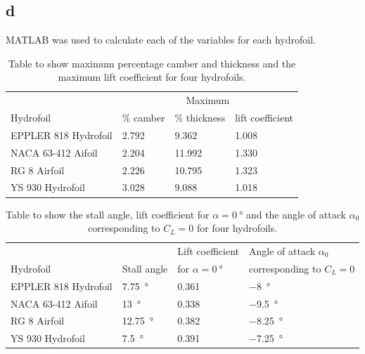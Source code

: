 \documentclass[11pt]{article}
\numberwithin{equation}{section}
\begin{document}
\subsection{d}
MATLAB was used to calculate each of the variables for each hydrofoil.

\begin{table}[H]
    \centering
    \begin{tabular}{@{}llll@{}}
    \toprule
        & \multicolumn{3}{c}{Maximum}\\
        \cline{2-4}
        Hydrofoil& \% camber & \% thickness & lift coefficient \\
    \midrule
        EPPLER 818 Hydrofoil & 2.792 & 9.362  & 1.008 \\
        NACA 63-412 Aifoil   & 2.204 & 11.992 & 1.330 \\
        RG 8 Airfoil         & 2.226 & 10.795 & 1.323 \\
        YS 930 Hydrofoil     & 3.028 & 9.088  & 1.018 \\ 
    \bottomrule
    \end{tabular}
    \caption{Table to show maximum percentage camber and thickness and the maximum lift coefficient for four hydrofoils.}
\end{table}
\begin{table}[H]
    \centering
    \begin{tabular}{@{}llll@{}}
    \toprule
        & & Lift coefficient & Angle of attack $\alpha_0$\\
        Hydrofoil & Stall angle  & for $\alpha = \SI{0}{\degree}$ & corresponding to $C_L = 0$\\
    \midrule
        EPPLER 818 Hydrofoil & \SI{7.75}{\degree}  & 0.361 & \SI{-8}{\degree}    \\
        NACA 63-412 Aifoil   & \SI{13}{\degree}    & 0.338 & \SI{-9.5}{\degree}  \\
        RG 8 Airfoil         & \SI{12.75}{\degree} & 0.382 & \SI{-8.25}{\degree} \\
        YS 930 Hydrofoil     & \SI{7.5}{\degree}  & 0.391 & \SI{-7.25}{\degree}  \\ 
    \bottomrule
    \end{tabular}
    \caption{Table to show the stall angle, lift coefficient for $\alpha = \SI{0}{\degree}$ and the angle of attack $\alpha_0$ corresponding to $C_L = 0$ for four hydrofoils.}
\end{table}
\end{document}
